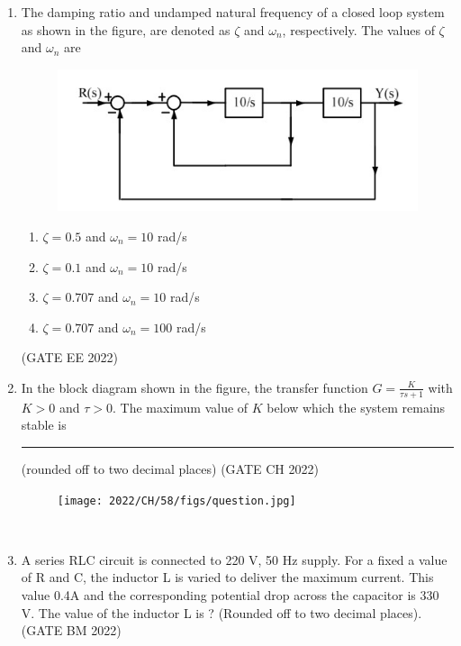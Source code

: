 \begin{enumerate}[label=\thechapter.\arabic*,ref=\thechapter.\theenumi]

\item The damping ratio and undamped natural frequency of a closed loop system as
shown in the figure, are denoted as $\zeta$ and $\omega_n$, respectively. The values of $\zeta$ and $\omega_n$
are 
\begin{figure}[!ht]
\centering
\begin{center}
\includegraphics[width=\columnwidth]{2022/EE/39/figs/question.jpg}
\end{center}
\end{figure}
\begin{enumerate}
    \item $\zeta = 0.5$ and $\omega_n = 10$ rad/s
    \item $\zeta = 0.1$ and $\omega_n = 10$ rad/s
    \item $\zeta = 0.707$ and $\omega_n = 10$ rad/s
    \item $\zeta = 0.707$ and $\omega_n = 100$ rad/s
\end{enumerate}
\hfill(GATE EE 2022)
\solution

\newpage
\item In the block diagram shown in the figure, the transfer function $G=\frac{K}{\tau s+1}$ with $K>0$ and $\tau>0$. The maximum value of $K$ below which the system remains stable is \rule{1cm}{0.15mm}(rounded off to two decimal places) \hfill (GATE CH 2022) 
\begin{figure}[htbp] 
\texttt{[image: 2022/CH/58/figs/question.jpg]} 
\end{figure}\\ 
\solution 
 
\newpage

\item
A series RLC circuit is connected to 220 V, 50 Hz supply. For a fixed a value of R and C, the inductor L is varied to deliver the maximum current. This value 0.4A and the corresponding potential drop across the capacitor is 330 V. The value of the inductor L is ? (Rounded off to two decimal places).
\hfill{(GATE BM 2022)}\\
 \solution
  
 \newpage
 

\end{enumerate}
